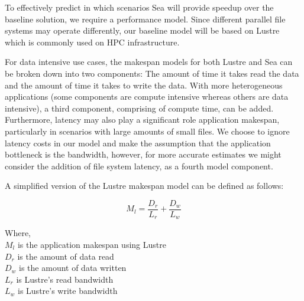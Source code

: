       To effectively predict in which scenarios Sea will provide speedup over
      the baseline solution, we require a performance model. Since different
      parallel file systems may operate differently, our baseline model will be
      based on Lustre which is commonly used on HPC infrastructure.

      For data intensive use cases, the makespan models for both Lustre and Sea
      can be broken down into two components: The amount of time it takes read
      the data and the amount of time it takes to write the data. With more
      heterogeneous applications (some components are compute intensive whereas
      others are data intensive), a third component, comprising of compute time,
      can be added. Furthermore, latency may also play a significant role
      application makespan, particularly in scenarios with large amounts of
      small files. We choose to ignore latency costs in our model and make the
      assumption that the application bottleneck is the bandwidth, however, for
      more accurate estimates we might consider the addition of file system
      latency, as a fourth model component.

      A simplified version of the Lustre makespan model can be defined as
      follows:

      \begin{equation}\label{eq:sea-comp:lustrenpc}
          M_{l} =  \frac{D_{r}}{L_{r}} + \frac{D_{w}}{L_{w}}
      \end{equation}

      Where, \\
      $M_{l}$ is the application makespan using Lustre \\
      $D_{r}$ is the amount of data read \\
      $D_{w}$ is the amount of data written \\
      $L_{r}$ is Lustre's read bandwidth \\
      $L_{w}$ is Lustre's write bandwidth \\



